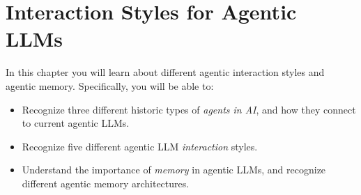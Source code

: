 

\chapter{Interaction Styles for Agentic LLMs}\label{chap:agents}



\begin{learningbox}
In this chapter you will learn about  different agentic interaction styles and agentic memory.
Specifically, you will be able to:
\begin{itemize}[leftmargin=*, nosep]
    \item Recognize three different historic types  of {\em agents in AI}, and how they connect to current agentic LLMs.  
    
    \item Recognize five different agentic LLM {\em interaction} styles. 
    
    \item Understand the importance of {\em memory} in agentic LLMs, and recognize different agentic memory architectures.

\end{itemize}
\end{learningbox}

